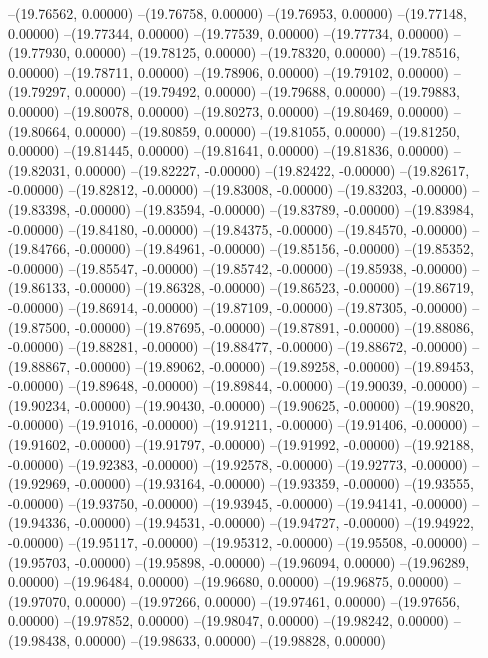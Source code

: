 --(19.76562, 0.00000)
--(19.76758, 0.00000)
--(19.76953, 0.00000)
--(19.77148, 0.00000)
--(19.77344, 0.00000)
--(19.77539, 0.00000)
--(19.77734, 0.00000)
--(19.77930, 0.00000)
--(19.78125, 0.00000)
--(19.78320, 0.00000)
--(19.78516, 0.00000)
--(19.78711, 0.00000)
--(19.78906, 0.00000)
--(19.79102, 0.00000)
--(19.79297, 0.00000)
--(19.79492, 0.00000)
--(19.79688, 0.00000)
--(19.79883, 0.00000)
--(19.80078, 0.00000)
--(19.80273, 0.00000)
--(19.80469, 0.00000)
--(19.80664, 0.00000)
--(19.80859, 0.00000)
--(19.81055, 0.00000)
--(19.81250, 0.00000)
--(19.81445, 0.00000)
--(19.81641, 0.00000)
--(19.81836, 0.00000)
--(19.82031, 0.00000)
--(19.82227, -0.00000)
--(19.82422, -0.00000)
--(19.82617, -0.00000)
--(19.82812, -0.00000)
--(19.83008, -0.00000)
--(19.83203, -0.00000)
--(19.83398, -0.00000)
--(19.83594, -0.00000)
--(19.83789, -0.00000)
--(19.83984, -0.00000)
--(19.84180, -0.00000)
--(19.84375, -0.00000)
--(19.84570, -0.00000)
--(19.84766, -0.00000)
--(19.84961, -0.00000)
--(19.85156, -0.00000)
--(19.85352, -0.00000)
--(19.85547, -0.00000)
--(19.85742, -0.00000)
--(19.85938, -0.00000)
--(19.86133, -0.00000)
--(19.86328, -0.00000)
--(19.86523, -0.00000)
--(19.86719, -0.00000)
--(19.86914, -0.00000)
--(19.87109, -0.00000)
--(19.87305, -0.00000)
--(19.87500, -0.00000)
--(19.87695, -0.00000)
--(19.87891, -0.00000)
--(19.88086, -0.00000)
--(19.88281, -0.00000)
--(19.88477, -0.00000)
--(19.88672, -0.00000)
--(19.88867, -0.00000)
--(19.89062, -0.00000)
--(19.89258, -0.00000)
--(19.89453, -0.00000)
--(19.89648, -0.00000)
--(19.89844, -0.00000)
--(19.90039, -0.00000)
--(19.90234, -0.00000)
--(19.90430, -0.00000)
--(19.90625, -0.00000)
--(19.90820, -0.00000)
--(19.91016, -0.00000)
--(19.91211, -0.00000)
--(19.91406, -0.00000)
--(19.91602, -0.00000)
--(19.91797, -0.00000)
--(19.91992, -0.00000)
--(19.92188, -0.00000)
--(19.92383, -0.00000)
--(19.92578, -0.00000)
--(19.92773, -0.00000)
--(19.92969, -0.00000)
--(19.93164, -0.00000)
--(19.93359, -0.00000)
--(19.93555, -0.00000)
--(19.93750, -0.00000)
--(19.93945, -0.00000)
--(19.94141, -0.00000)
--(19.94336, -0.00000)
--(19.94531, -0.00000)
--(19.94727, -0.00000)
--(19.94922, -0.00000)
--(19.95117, -0.00000)
--(19.95312, -0.00000)
--(19.95508, -0.00000)
--(19.95703, -0.00000)
--(19.95898, -0.00000)
--(19.96094, 0.00000)
--(19.96289, 0.00000)
--(19.96484, 0.00000)
--(19.96680, 0.00000)
--(19.96875, 0.00000)
--(19.97070, 0.00000)
--(19.97266, 0.00000)
--(19.97461, 0.00000)
--(19.97656, 0.00000)
--(19.97852, 0.00000)
--(19.98047, 0.00000)
--(19.98242, 0.00000)
--(19.98438, 0.00000)
--(19.98633, 0.00000)
--(19.98828, 0.00000)
